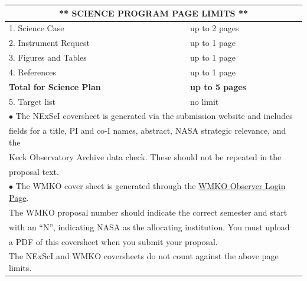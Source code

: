 \documentclass[12pt]{article}
\begin{document}
\begin{table}[h]
\centering
\begin{tabular*}{0.98\textwidth}{| p{} | p{} |}
\hline
\multicolumn{2}{|c|}{\bf{}** SCIENCE PROGRAM PAGE LIMITS **} \\
\hline
   \hspace{0.1in} 1. Science Case & up to 2 pages \\ \hline
   \hspace{0.1in} 2. Instrument Request & up to 1 page \\ \hline
   \hspace{0.1in} 3. Figures and Tables & up to 1 page \\ \hline
   \hspace{0.1in} 4. References & up to 1 page \\ \hline
  {\bf Total for Science Plan}  & {\bf up to 5 pages} \\  \hline
   \hspace{0.1in} 5. Target list & no limit \\ \hline
 \multicolumn{2}{|l|}{{\hspace{0.1in} $\bullet$ The NExScI coversheet is generated via the submission website and includes}} \\ 
 \multicolumn{2}{|l|}{{\hspace{0.25in} fields for a title, PI and co-I names, abstract, NASA strategic relevance, and the}} \\
 \multicolumn{2}{|l|}{{\hspace{0.25in} Keck Observatory Archive data check. These should not be repeated in the }} \\
  \multicolumn{2}{|l|}{{\hspace{0.25in} proposal text.}} \\
  \multicolumn{2}{|l|}{{\hspace{0.1in} $\bullet$  The WMKO cover sheet is generated through the 
  \href{https://www2.keck.hawaii.edu/inst/PILogin/login.php}{WMKO Observer Login Page}.}} \\ 
  \multicolumn{2}{|l|}{{\hspace{0.25in} The WMKO proposal number should indicate the correct semester and start}} \\ 
  \multicolumn{2}{|l|}{{\hspace{0.25in} with an “N”, indicating NASA as the allocating institution.  You must upload}} \\ 
  \multicolumn{2}{|l|}{{\hspace{0.25in} a PDF of this coversheet when you submit your proposal.}} \\ 
  \multicolumn{2}{|l|}{The NExScI and WMKO coversheets do not count against the above page limits.} \\
\hline
\end{tabular*}
\end{table}
\end{document}
